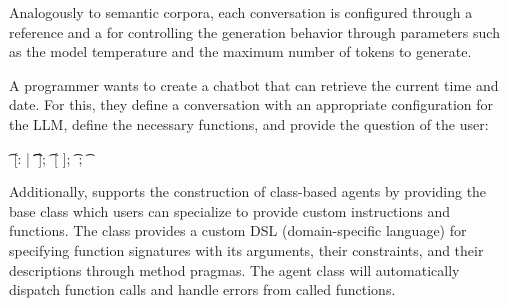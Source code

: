 Analogously to semantic corpora, each conversation is configured through a  reference and a  for controlling the generation behavior through parameters such as the model temperature and the maximum number of tokens to generate.

\begin{example}
	A programmer wants to create a chatbot that can retrieve the current time and date.
	For this, they define a conversation with an appropriate configuration for the LLM, define the necessary functions, and provide the question of the user:

	\begin{multicode}
		  \n
		\t	{} [: | \n
		\t	\t	{}  ]; \n
		\t	{}   [ ]; \n
		\t	{} ; \n
		\t	{} 
	\end{multicode}
\end{example}

Additionally, \semtex supports the construction of class-based agents by providing the base class  which users can specialize to provide custom instructions and functions.
The  class provides a custom DSL (domain-specific language) for specifying function signatures with its arguments, their constraints, and their descriptions through method pragmas.
The agent class will automatically dispatch function calls and handle errors from called functions.

